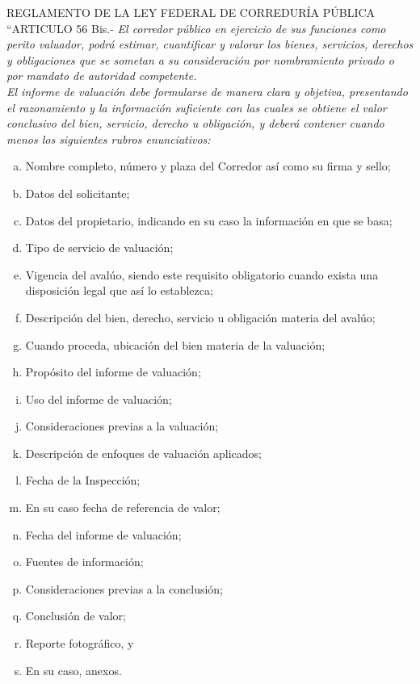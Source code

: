 

\textcolor{principal}{REGLAMENTO DE LA LEY FEDERAL DE CORREDUR\'IA P\'UBLICA}\\


``\textcolor{secundario}{ARTICULO 56 Bis.-} \textit{El corredor p\'ublico en ejercicio de sus funciones como perito valuador, podr\'a estimar, cuantificar y valorar los bienes, servicios, derechos y obligaciones que se sometan a su consideraci\'on por nombramiento privado o por mandato de autoridad competente.} \\

\textit{El informe de valuaci\'on debe formularse de manera clara y objetiva, presentando el razonamiento y la informaci\'on suficiente con las cuales se obtiene el valor conclusivo del bien, servicio, derecho u obligaci\'on, y deber\'a contener cuando menos los siguientes rubros enunciativos: }

\begin{enumerate}[a)]

\item Nombre completo, n\'umero y plaza del Corredor as\'i como su firma y sello; 
\item Datos del solicitante; 
\item Datos del propietario, indicando en su caso la informaci\'on en que se basa; 
\item Tipo de servicio de valuaci\'on; 
\item Vigencia del aval\'uo, siendo este requisito obligatorio cuando exista una disposici\'on legal que as\'i lo establezca; 
\item Descripci\'on del bien, derecho, servicio u obligaci\'on materia del aval\'uo; 
\item  Cuando proceda, ubicaci\'on del bien materia de la valuaci\'on; 
\item Prop\'osito del informe de valuaci\'on; 
\item Uso del informe de valuaci\'on; 
\item Consideraciones previas a la valuaci\'on; 
\item Descripci\'on de enfoques de valuaci\'on aplicados; 
\item Fecha de la Inspecci\'on; 
\item En su caso fecha de referencia de valor; 
\item Fecha del informe de valuaci\'on; 
\item Fuentes de informaci\'on; 
\item Consideraciones previas a la conclusi\'on; 
\item Conclusi\'on de valor; 
\item Reporte fotogr\'afico, y 
\item En su caso, anexos. 

\end{enumerate}

